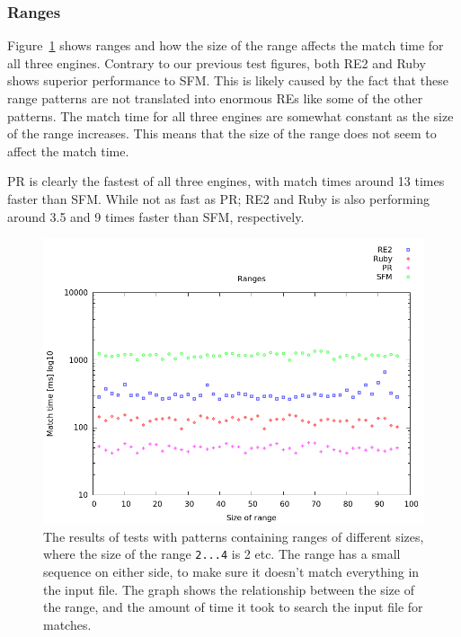 \documentclass[12pt]{article}
\theoremstyle{definition}
\begin{document}
\subsubsection{Ranges}

Figure~\ref{graph:cases:ranges} shows ranges and how the size of the range affects the match time for all three engines. Contrary to our previous test figures, both RE2 and Ruby shows superior performance to SFM. This is likely caused by the fact that these range patterns are not translated into enormous REs like some of the other patterns. The match time for all three engines are somewhat constant as the size of the range increases. This means that the size of the range does not seem to affect the match time.

PR is clearly the fastest of all three engines, with match times around 13 times faster than SFM. While not as fast as PR; RE2 and Ruby is also performing around 3.5 and 9 times faster than SFM, respectively.

\begin{figure}[H]
	\begin{center}
		\includegraphics[scale=0.55]{graphs/ranges.png}	
	\end{center}
	\caption{The results of tests with patterns containing ranges of different sizes, where the size of the range \texttt{2...4} is 2 etc. The range has a small sequence on either side, to make sure it doesn't match everything in the input file. The graph shows the relationship between the size of the range, and the amount of time it took to search the input file for matches.}
	\label{graph:cases:ranges}
\end{figure}
\end{document}
